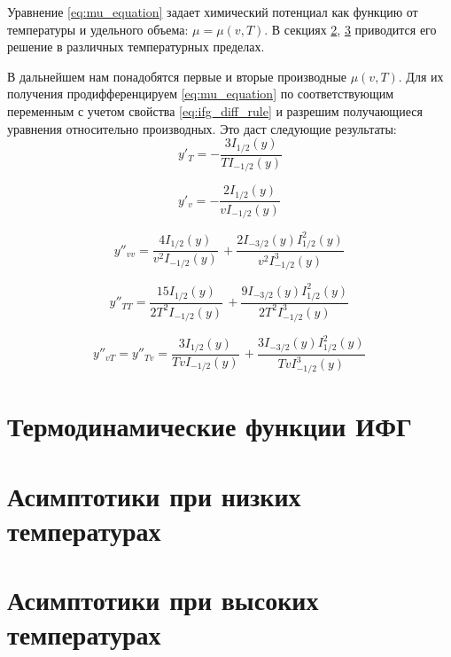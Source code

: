 Уравнение \eqref{eq:mu_equation} задает химический потенциал как функцию от температуры и удельного объема: $\mu = \mu(v, T)$.
В секциях \ref{sec:asymp_low}, \ref{sec:asymp_high} приводится его решение в различных температурных пределах.

В дальнейшем нам понадобятся первые и вторые производные $\mu(v, T)$.
Для их получения продифференцируем \eqref{eq:mu_equation} по соответствующим переменным с учетом свойства \eqref{eq:ifg_diff_rule} и разрешим получающиеся уравнения относительно производных. Это даст следующие результаты:
\begin{equation}
   \label{eq:mu_T}
   y'_{T} = -\frac{3 I_{1 / 2}(y)}{T I_{-1 / 2}(y)}
\end{equation}

\begin{equation}
   \label{eq:mu_v}
   y'_{v} = - \frac{2 I_{1 / 2} (y)}{v I_{-1 / 2} (y)}\,
\end{equation}

\begin{equation}
   \label{eq:mu_vv}
   y''_{vv} = \frac{4 I_{1 / 2} (y)}{v^2 I_{-1 / 2} (y)}\, + \frac{2 I_{-3 /2} (y) I_{1 / 2} ^2 (y)}{v^2 I_{-1 /2}^3 (y)}\,
\end{equation}

\begin{equation}
   \label{eq:mu_TT}
   y''_{TT} = \frac{15 I_{1 /2} (y)}{2 T^2 I_{-1 /2} (y)}\, + \frac{9 I_{-3 /2}(y) I_{1 /2}^2 (y)}{2 T^2 I_{-1 /2}^3 (y)}\,
\end{equation}

\begin{equation}
   \label{eq:mu_vT}
   y''_{vT} = y''_{Tv} = \frac{3 I_{1 /2}(y)}{T v I_{-1 /2} (y)}\, + \frac{3 I_{-3 /2} (y) I_{1 /2}^2 (y)}{T v I_{-1 /2}^3 (y)}\,
\end{equation}

\section{Термодинамические функции ИФГ}

\section{Асимптотики при низких температурах}
\label{sec:asymp_low}

\section{Асимптотики при высоких температурах}
\label{sec:asymp_high}

